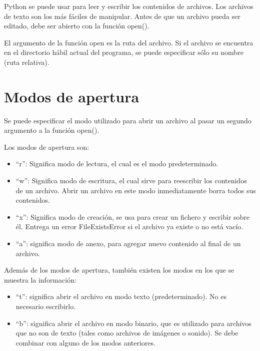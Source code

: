 \documentclass{report}
\newcommand{\doble}[1]{``#1''}
\begin{document}
Python se puede usar para leer y escribir los contenidos de archivos. Los archivos de texto son los más fáciles de manipular.
Antes de que un archivo pueda ser editado, debe ser abierto con la función open().


El argumento de la función open es la ruta del archivo. Si el archivo se encuentra en el directorio hábil actual del programa, se puede especificar sólo su nombre (ruta relativa).

\section{Modos de apertura}

Se puede especificar el modo utilizado para abrir un archivo al pasar un segundo argumento a la función open().

Los modos de apertura son:

\begin{itemize}
  \item \doble{r}: Significa modo de lectura, el cual es el modo predeterminado.
  

  \item \doble{w}: Significa modo de escritura, el cual sirve para reescribir los contenidos de un archivo. Abrir un archivo en este modo inmediatamente borra todos sus contenidos.
  

  \item \doble{x}: Significa modo de creación, se usa para crear un fichero y escribir sobre él. Entrega un error FileExistsError si el archivo ya existe o no está vacío.
  

  \item \doble{a}: significa modo de anexo, para agregar nuevo contenido al final de un archivo.


\end{itemize}

Además de los modos de apertura, también existen los modos en los que se muestra la información:

\begin{itemize}
  \item \doble{t}: significa abrir el archivo en modo texto (predeterminado). No es necesario escribirlo.
  \item \doble{b}: significa abrir el archivo en modo binario, que es utilizado para archivos que no son de texto (tales como archivos de imágenes o sonido). Se debe combinar con alguno de los modos anteriores.


\end{itemize}
\end{document}
